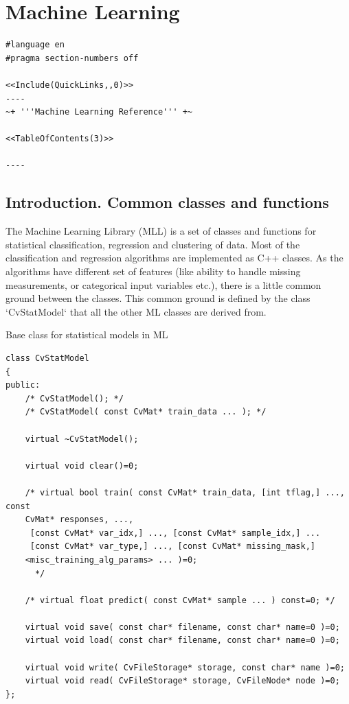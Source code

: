 \chapter{Machine Learning}
\begin{verbatim}
#language en
#pragma section-numbers off

<<Include(QuickLinks,,0)>>
----
~+ '''Machine Learning Reference''' +~

<<TableOfContents(3)>>

----

\end{verbatim}
\section{Introduction. Common classes and functions}

The Machine Learning Library (MLL) is a set of classes and functions for statistical classification, regression and clustering of data.
\newline
\newline
Most of the classification and regression algorithms are implemented as C++ classes. As the algorithms have different set of features (like ability to handle missing measurements, or categorical input variables etc.), there is a little common ground between the classes. This common ground is defined by the class `CvStatModel` that all the other ML classes are derived from.



Base class for statistical models in ML

\begin{lstlisting}
class CvStatModel
{
public:
    /* CvStatModel(); */
    /* CvStatModel( const CvMat* train_data ... ); */

    virtual ~CvStatModel();

    virtual void clear()=0;

    /* virtual bool train( const CvMat* train_data, [int tflag,] ..., const 
	CvMat* responses, ...,
     [const CvMat* var_idx,] ..., [const CvMat* sample_idx,] ...
     [const CvMat* var_type,] ..., [const CvMat* missing_mask,] 
	<misc_training_alg_params> ... )=0;
      */

    /* virtual float predict( const CvMat* sample ... ) const=0; */

    virtual void save( const char* filename, const char* name=0 )=0;
    virtual void load( const char* filename, const char* name=0 )=0;

    virtual void write( CvFileStorage* storage, const char* name )=0;
    virtual void read( CvFileStorage* storage, CvFileNode* node )=0;
};
\end{lstlisting}


